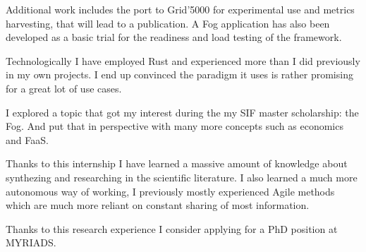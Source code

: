 Additional work includes the port to Grid'5000 for experimental use and metrics harvesting, that will lead to a publication. A Fog application has also been developed as a basic trial for the readiness and load testing of the framework.

\varthreestars

Technologically I have employed Rust and experienced more than I did previously in my own projects. I end up convinced the paradigm it uses is rather promising for a great lot of use cases.

I explored a topic that got my interest during the my SIF master scholarship: the Fog. And put that in perspective with many more concepts such as economics and \gls{FaaS}.

Thanks to this internship I have learned a massive amount of knowledge about synthezing and researching in the scientific literature. I also learned a much more autonomous way of working, I previously mostly experienced Agile methods which are much more reliant on constant sharing of most information.

Thanks to this research experience I consider applying for a PhD position at MYRIADS. 